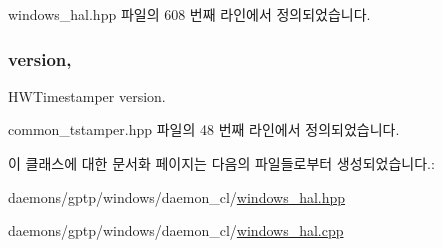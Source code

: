 windows\+\_\+hal.\+hpp 파일의 608 번째 라인에서 정의되었습니다.

\subsubsection[{\texorpdfstring{version}{version}}]{ version\hspace{0.3cm}{\ttfamily [protected]}, {\ttfamily [inherited]}}\hypertarget{class_common_timestamper_ab22abc2906422da61885ac6c8e6a1a59}{}\label{class_common_timestamper_ab22abc2906422da61885ac6c8e6a1a59}


H\+W\+Timestamper version. 



common\+\_\+tstamper.\+hpp 파일의 48 번째 라인에서 정의되었습니다.



이 클래스에 대한 문서화 페이지는 다음의 파일들로부터 생성되었습니다.\+:\begin{DoxyCompactItemize}
\item 
daemons/gptp/windows/daemon\+\_\+cl/\hyperlink{windows__hal_8hpp}{windows\+\_\+hal.\+hpp}\item 
daemons/gptp/windows/daemon\+\_\+cl/\hyperlink{windows__hal_8cpp}{windows\+\_\+hal.\+cpp}\end{DoxyCompactItemize}

